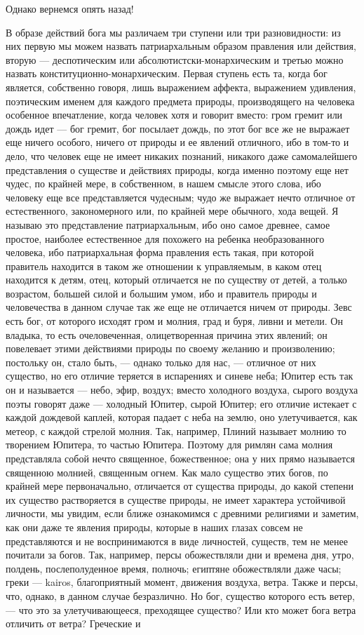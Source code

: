 \documentclass[12pt]{article}
\begin{document}
Однако вернемся опять назад! 

В образе действий бога мы различаем три ступени или три разновидности: из них первую мы можем назвать патриархальным образом правления или действия, вторую --- деспотическим или абсолютистски-монархическим и третью можно назвать конституционно-монархическим. Первая ступень есть та, когда бог является, собственно говоря, лишь выражением аффекта, выражением удивления, поэтическим именем для каждого предмета природы, производящего на человека особенное впечатление, когда человек хотя и говорит вместо: гром гремит или дождь идет --- бог гремит, бог посылает дождь, по этот бог все же не выражает еще ничего особого, ничего от природы и ее явлений отличного, ибо в том-то и дело, что человек еще не имеет никаких познаний, никакого даже самомалейшего представления о существе и действиях природы, когда именно поэтому еще нет чудес, по крайней мере, в собственном, в нашем смысле этого слова, ибо человеку еще все представляется чудесным; чудо же выражает нечто отличное от естественного, закономерного или, по крайней мере обычного, хода вещей. Я называю это представление патриархальным, ибо оно самое древнее, самое простое, наиболее естественное для похожего на ребенка необразованного человека, ибо патриархальная форма правления есть такая, при которой правитель находится в таком же отношении к управляемым, в каком отец находится к детям, отец, который отличается не по существу от детей, а только возрастом, большей силой и большим умом, ибо и правитель природы и человечества в данном случае так же еще не отличается ничем от природы. Зевс есть бог, от которого исходят гром и молния, град и буря, ливни и метели. Он владыка, то есть очеловеченная, олицетворенная причина этих явлений; он повелевает этими действиями природы по своему желанию и произволению; постольку он, стало быть, --- однако только для нас, --- отличное от них существо, но его отличие теряется в испарениях и синеве неба; Юпитер есть так он и называется --- небо, эфир, воздух; вместо холодного воздуха, сырого воздуха поэты говорят даже --- холодный Юпитер, сырой Юпитер; его отличие истекает с каждой дождевой каплей, которая падает с неба на землю, оно улетучивается, как метеор, с каждой стрелой молния. Так, например, Плиний называет молнию то творением Юпитера, то частью Юпитера. Поэтому для римлян сама молния представляла собой нечто священное, божественное; она у них прямо называется священною молнией, священным огнем. Как мало существо этих богов, по крайней мере первоначально, отличается от существа природы, до какой степени их существо растворяется в существе природы, не имеет характера устойчивой личности, мы увидим, если ближе ознакомимся с древними религиями и заметим, как они даже те явления природы, которые в наших глазах совсем не представляются и не воспринимаются в виде личностей, существ, тем не менее почитали за богов. Так, например, персы обожествляли дни и времена дня, утро, полдень, послеполуденное время, полночь; египтяне обожествляли даже часы; греки --- kairos, благоприятный момент, движения воздуха, ветра. Также и персы, что, однако, в данном случае безразлично. Но бог, существо которого есть ветер, --- что это за улетучивающееся, преходящее существо? Или кто может бога ветра отличить от ветра? Греческие и 
\end{document}
